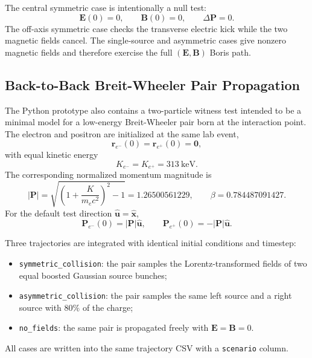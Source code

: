 \documentclass[11pt]{article}
\newcommand{\vect}[1]{\boldsymbol{#1}}
\newcommand{\E}{\vect{E}}
\newcommand{\B}{\vect{B}}
\newcommand{\Pmom}{\vect{P}}
\numberwithin{equation}{section}
\begin{document}
\begin{center}
\small
\resizebox{\textwidth}{!}{%

}
\end{center}

The central symmetric case is intentionally a null test:
\begin{equation}
  \E(0)=0,\qquad \B(0)=0,\qquad \Delta\Pmom=0.
\end{equation}
The off-axis symmetric case checks the transverse electric kick while the two
magnetic fields cancel.  The single-source and asymmetric cases give nonzero
magnetic fields and therefore exercise the full \((\E,\B)\) Boris path.

\subsection{Back-to-Back Breit-Wheeler Pair Propagation}

The Python prototype also contains a two-particle witness test intended to be a
minimal model for a low-energy Breit-Wheeler pair born at the interaction point.
The electron and positron are initialized at the same lab event,
\begin{equation}
  \vect r_{e^-}(0)=\vect r_{e^+}(0)=\vect 0,
\end{equation}
with equal kinetic energy
\begin{equation}
  K_{e^-}=K_{e^+}=313~\mathrm{keV}.
\end{equation}
The corresponding normalized momentum magnitude is
\begin{equation}
  |\Pmom|
  =
  \sqrt{
    \left(1+\frac{K}{m_ec^2}\right)^2-1
  }
  =
  1.26500561229,
  \qquad
  \beta = 0.784487091427.
\end{equation}
For the default test direction \(\hat{\vect u}=\hat{\vect x}\),
\begin{equation}
  \Pmom_{e^-}(0)=|\Pmom|\hat{\vect u},
  \qquad
  \Pmom_{e^+}(0)=-|\Pmom|\hat{\vect u}.
\end{equation}

Three trajectories are integrated with identical initial conditions and timestep:
\begin{itemize}
  \item \texttt{symmetric\_collision}: the pair samples the
        Lorentz-transformed fields of two equal boosted Gaussian source bunches;
  \item \texttt{asymmetric\_collision}: the pair samples the same left source
        and a right source with \(80\%\) of the charge;
  \item \texttt{no\_fields}: the same pair is propagated freely with
        \(\E=\B=0\).
\end{itemize}
All cases are written into the same trajectory CSV with a \texttt{scenario}
column.
\end{document}
